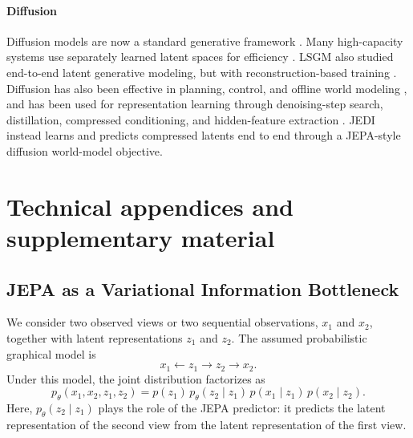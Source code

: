 \documentclass{article}
\begin{document}
\paragraph{Diffusion}
Diffusion models are now a standard generative framework \citep{song2019NCSN,ho2020ddpm,karras2022EDM}. Many high-capacity systems use separately learned latent spaces for efficiency \citep{rombach2022StableDiffusion,esser2024StableDiffusion3,bruce2024genie,parkerholder2024genie2,liu2024sora}. LSGM also studied end-to-end latent generative modeling, but with reconstruction-based training \citep{vahdat2021LSGM}. Diffusion has also been effective in planning, control, and offline world modeling \citep{janner2022diffuser,chi2023DiffusionPolicy,jackson2024pgd,wang2022DiffPolicyExpressive,frans2025diffusionGuidance,lu2023synther,ding2024diffusion}, and has been used for representation learning through denoising-step search, distillation, compressed conditioning, and hidden-feature extraction \citep{luo2023DiffHyperfeatures,yue2024ExpDiffTimeSteps,yang2023NUSDiffasRepLearner,zhang2022UnsupRepLearnPretrainedSEA,pandey2022diffusevae,nielsen2023diffenc,baranchuk2021LabelEfficientUNETFeat,xiang2023DiffAEAreUnified}. JEDI instead learns and predicts compressed latents end to end through a JEPA-style diffusion world-model objective.





\appendix

\section{Technical appendices and supplementary material}
\label{sec:proof}
\subsection{JEPA as a Variational Information Bottleneck}
\label{app:jepa-ib}

We consider two observed views or two sequential observations, $x_1$ and $x_2$, together with latent representations $z_1$ and $z_2$. The assumed probabilistic graphical model is
\[
x_1 \leftarrow z_1 \rightarrow z_2 \rightarrow x_2 .
\]
Under this model, the joint distribution factorizes as
\begin{equation}
p_\theta(x_1,x_2,z_1,z_2)
=
p(z_1)\,
p_\theta(z_2\mid z_1)\,
p(x_1\mid z_1)\,
p(x_2\mid z_2).
\label{eq:jepa-factorization}
\end{equation}
Here, $p_\theta(z_2\mid z_1)$ plays the role of the JEPA predictor: it predicts the latent representation of the second view from the latent representation of the first view.
\end{document}
